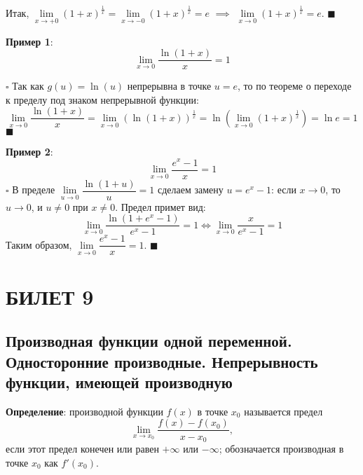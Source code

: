 \documentclass[12pt, a4paper, reqno]{article}
\begin{document}
    Итак, $\lim\limits_{x\to +0} (1 + x)^{\frac{1}{x}} = \lim\limits_{x\to -0} (1 + x)^{\frac{1}{x}}
    = e$ $\implies$ $\lim\limits_{x\to 0} (1 + x)^{\frac{1}{x}} = e$. $\blacksquare$

    \textbf{Пример 1}:
    \begin{equation*}
        \lim\limits_{x\to 0} \dfrac{\ln{(1 + x)}}{x} = 1
    \end{equation*}

    $\square$ Так как $g(u) = \ln{(u)}$ непрерывна в точке $u = e$, то по теореме о переходе к
    пределу под знаком непрерывной функции:
    \begin{equation*}
        \lim\limits_{x\to 0} \dfrac{\ln{(1 + x)}}{x} = \lim\limits_{x\to 0}
        (\ln{(1 + x)})^{\frac{1}{x}} = \ln{\left(\lim\limits_{x\to 0} (1 + x)^{\frac{1}{x}}\right)}
        = \ln{e} = 1
    \end{equation*}
    $\blacksquare$

    \textbf{Пример 2}:
    \begin{equation*}
        \lim\limits_{x\to 0} \dfrac{e^x - 1}{x} = 1
    \end{equation*}
    $\square$ В пределе $\lim\limits_{u\to 0} \dfrac{\ln{(1 + u)}}{u} = 1$ сделаем замену
    $u = e^x - 1$: если $x\to 0$, то $u\to 0$, и $u\neq 0$ при $x\neq 0$. Предел примет вид:
    \begin{equation*}
        \lim\limits_{x\to 0} \dfrac{\ln{(1 + e^x - 1)}}{e^x - 1} = 1 \iff \lim\limits_{x\to 0}
        \dfrac{x}{e^x - 1} = 1
    \end{equation*}
    Таким образом, $\lim\limits_{x\to 0} \dfrac{e^x - 1}{x} = 1$. $\blacksquare$

\newpage
\section{БИЛЕТ 9}

\subsection{Производная функции одной переменной. Односторонние производные. Непрерывность функции,
            имеющей производную}

    \textbf{Определение}: производной функции $f(x)$ в точке $x_0$ называется предел
    \begin{equation*}
        \lim\limits_{x\to x_0} \dfrac{f(x) - f(x_0)}{x - x_0},
    \end{equation*}
    если этот предел конечен или равен $+\infty$ или $-\infty$; обозначается производная в точке
    $x_0$ как $f'(x_0)$.
\end{document}
